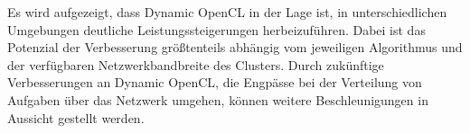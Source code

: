 Es wird aufgezeigt, dass Dynamic OpenCL in der Lage ist, in unterschiedlichen Umgebungen deutliche Leistungssteigerungen herbeizuführen. Dabei ist das Potenzial der Verbesserung größtenteils abhängig vom jeweiligen Algorithmus und der verfügbaren Netzwerkbandbreite des Clusters. Durch zukünftige Verbesserungen an Dynamic OpenCL, die Engpässe bei der Verteilung von Aufgaben über das Netzwerk umgehen, können weitere Beschleunigungen in Aussicht gestellt werden.